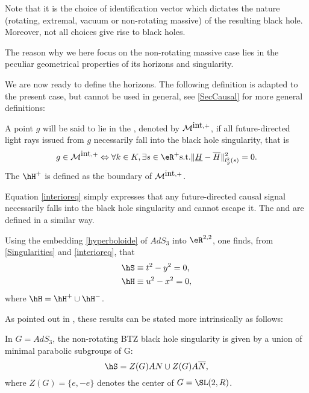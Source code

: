  Note that it is the choice of identification vector which dictates the nature (rotating, extremal, vacuum or non-rotating massive) of the resulting black hole. Moreover, not all choices give rise to black holes.

 The reason why we here focus on the non-rotating massive case lies in the peculiar geometrical properties of its horizons and singularity.  

 We are now ready to define the horizons. The following definition is adapted to the present case, but cannot be used in general, see \ref{SecCausal} for more general definitions:

 \begin{definition}
 A point $g$ will be said to lie in the , denoted by ${\cal M}^{\mbox{int},+}$, if all future-directed light rays issued from $g$ necessarily fall into the black hole singularity, that is
 \begin{equation}\label{interioreq}
 g \in {\cal M}^{\mbox{int},+} \Leftrightarrow \forall k \in K, \exists s \in
 \eR^+  \mbox{s.t.}  \|\underline{H} - \overline{H}\|^2_{l^k_g (s)}=0.
 \end{equation}
 The  $\hH^+$ is defined as the boundary of ${\cal M}^{\mbox{int},+}$.
 \label{interior-horizons}
 \end{definition}
 Equation \eqref{interioreq} simply expresses that any future-directed causal signal necessarily falls into the black hole singularity and cannot escape it. The  and  are defined in a similar way.

Using the embedding \eqref{hyperboloide} of $AdS_3$ into $\eR^{2,2}$, one finds, from \eqref{Singularities} and \eqref{interioreq}, that
\begin{equation}		\label{BTZSingHor}
	\begin{aligned}[]
		\hS	&\equiv t^2 - y^2 = 0,\\
		\hH	&\equiv u^2 - x^2 = 0,
	\end{aligned}
\end{equation}
 where $\hH = \hH^+ \cup \hH^-$.

As pointed out in \cite{Keio}, these results can be stated more intrinsically as follows:
\begin{proposition}
	In $G=AdS_3$, the non-rotating BTZ black hole singularity is given by a union of minimal parabolic subgroups of G:
	\begin{equation}
	\hS = Z(G) A N \cup Z(G) A \overline{N},
	 \end{equation}
	 where $Z(G)=\{e,-e\}$ denotes the center of $G=\SL(2,R)$.
	\label{BTZSing}
\end{proposition}


